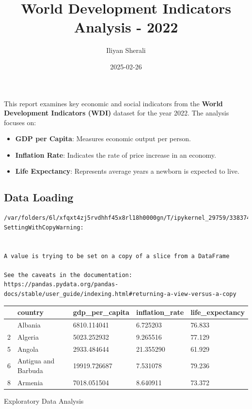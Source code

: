 \documentclass[
  letterpaper,
  DIV=11,
  numbers=noendperiod]{scrartcl}
\title{World Development Indicators Analysis - 2022}
\author{Iliyan Sherali}
\date{2025-02-26}
\providecommand{\tightlist}{%
  \setlength{\itemsep}{0pt}\setlength{\parskip}{0pt}}\usepackage{longtable,booktabs,array}
\begin{document}
\maketitle


This report examines key economic and social indicators from the
\textbf{World Development Indicators (WDI)} dataset for the year 2022.
The analysis focuses on:

\begin{itemize}
\tightlist
\item
  \textbf{GDP per Capita}: Measures economic output per person.
\item
  \textbf{Inflation Rate}: Indicates the rate of price increase in an
  economy.
\item
  \textbf{Life Expectancy}: Represents average years a newborn is
  expected to live.
\end{itemize}

\subsection{Data Loading}\label{data-loading}

\begin{verbatim}
/var/folders/6l/xfqxt4zj5rvdhhf45x8rl18h0000gn/T/ipykernel_29759/3383743568.py:10: SettingWithCopyWarning:


A value is trying to be set on a copy of a slice from a DataFrame

See the caveats in the documentation: https://pandas.pydata.org/pandas-docs/stable/user_guide/indexing.html#returning-a-view-versus-a-copy
\end{verbatim}

\begin{longtable}[]{@{}lllll@{}}
\toprule\noalign{}
& country & gdp\_per\_capita & inflation\_rate & life\_expectancy \\
\midrule\noalign{}
\endhead
\bottomrule\noalign{}
\endlastfoot
1 & Albania & 6810.114041 & 6.725203 & 76.833 \\
2 & Algeria & 5023.252932 & 9.265516 & 77.129 \\
5 & Angola & 2933.484644 & 21.355290 & 61.929 \\
6 & Antigua and Barbuda & 19919.726687 & 7.531078 & 79.236 \\
8 & Armenia & 7018.051504 & 8.640911 & 73.372 \\
\end{longtable}

Exploratory Data Analysis
\end{document}
